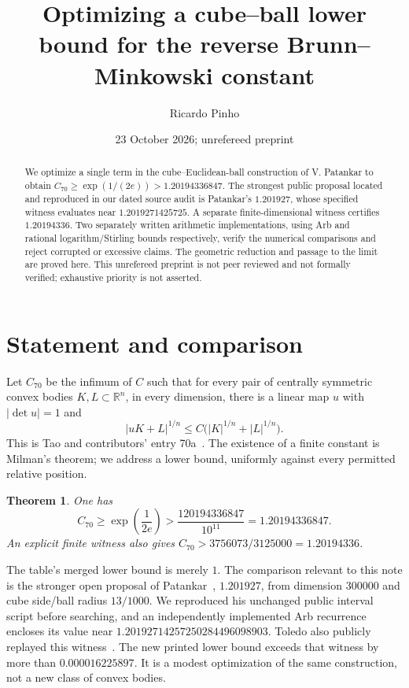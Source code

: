 \documentclass[11pt]{amsart}
\title[A cube--ball lower bound]{Optimizing a cube--ball lower bound for the reverse Brunn--Minkowski constant}
\author{Ricardo Pinho}
\date{23 October 2026; unrefereed preprint}
\newtheorem{theorem}{Theorem}
\newcommand{\R}{\mathbb R}
\begin{document}
\begin{abstract}
We optimize a single term in the cube--Euclidean-ball construction of
V. Patankar to obtain $C_{70}\ge \exp(1/(2e))>1.20194336847$.
The strongest public proposal located and reproduced in our dated source
audit is Patankar's $1.201927$, whose specified witness evaluates near
$1.2019271425725$. A separate finite-dimensional witness certifies
$1.20194336$. Two separately written arithmetic implementations, using
Arb and rational logarithm/Stirling bounds respectively, verify the
numerical comparisons and reject corrupted or excessive claims.
The geometric reduction and passage to the limit are proved here.
This unrefereed preprint is not peer reviewed and not formally verified;
exhaustive priority is not asserted.
\end{abstract}
\maketitle

\section{Statement and comparison}
Let $C_{70}$ be the infimum of $C$ such that for every pair of centrally
symmetric convex bodies $K,L\subset\R^n$, in every dimension, there is a
linear map $u$ with $|\det u|=1$ and
\[
 |uK+L|^{1/n}\le C\bigl(|K|^{1/n}+|L|^{1/n}\bigr).
\]
This is Tao and contributors' entry 70a~\cite{table}.
The existence of a finite constant is Milman's theorem; we address a lower
bound, uniformly against every permitted relative position.
\begin{theorem}\label{main}
One has
\[
 C_{70}\ge \exp\!\left(\frac1{2e}\right)>\frac{120194336847}{10^{11}}
 =1.20194336847.
\]
An explicit finite witness also gives
$C_{70}>3756073/3125000=1.20194336$.
\end{theorem}

The table's merged lower bound is merely $1$. The comparison relevant to
this note is the stronger open proposal of Patankar~\cite{patankar},
$1.201927$, from dimension $300000$ and cube side/ball radius $13/1000$.
We reproduced his unchanged public interval script before searching, and
an independently implemented Arb recurrence encloses its value near
$1.20192714257250284496098903$. Toledo also publicly replayed this
witness~\cite{toledo}. The new printed lower bound exceeds that witness
by more than $0.000016225897$. It is a modest optimization of the same
construction, not a new class of convex bodies.
\end{document}
